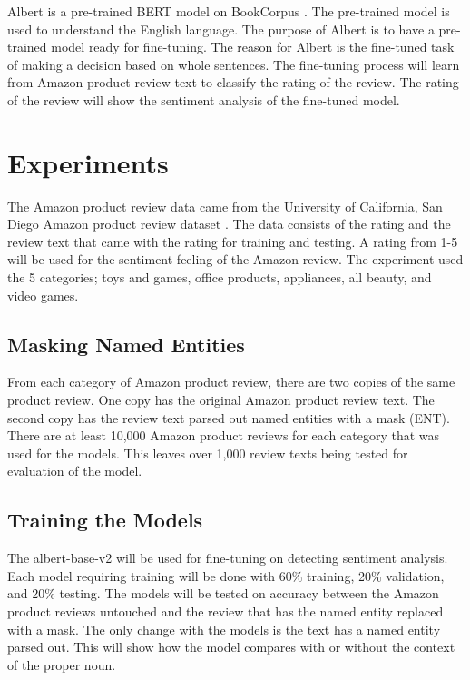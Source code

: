 \documentclass[11pt,a4paper]{article}
\begin{document}
Albert is a pre-trained BERT model on BookCorpus \cite{DBLP:journals/corr/abs-1909-11942}. The pre-trained model is used to understand the English language. The purpose of Albert is to have a pre-trained model ready for fine-tuning. The reason for Albert is the fine-tuned task of making a decision based on whole sentences. The fine-tuning process will learn from Amazon product review text to classify the rating of the review. The rating of the review will show the sentiment analysis of the fine-tuned model.

\section{Experiments}

The Amazon product review data came from the University of California, San Diego Amazon product review dataset \cite{data}. The data consists of the rating and the review text that came with the rating for training and testing. A rating from 1-5 will be used for the sentiment feeling of the Amazon review. The experiment used the 5 categories; toys and games, office products, appliances, all beauty, and video games.

\subsection{Masking Named Entities}

From each category of Amazon product review, there are two copies of the same product review. One copy has the original Amazon product review text. The second copy has the review text parsed out named entities with a mask (ENT). There are at least 10,000 Amazon product reviews for each category that was used for the models. This leaves over 1,000 review texts being tested for evaluation of the model.

\subsection{Training the Models}

The albert-base-v2 will be used for fine-tuning on detecting sentiment analysis. Each model requiring training will be done with 60\% training, 20\% validation, and 20\% testing. The models will be tested on accuracy between the Amazon product reviews untouched and the review that has the named entity replaced with a mask. The only change with the models is the text has a named entity parsed out. This will show how the model compares with or without the context of the proper noun.
\end{document}
